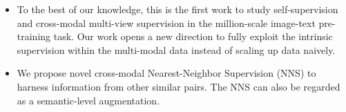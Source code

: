 \begin{itemize}[leftmargin=*]
    \item 
    To the best of our knowledge, this is the first work to study self-supervision and cross-modal multi-view supervision in the million-scale image-text pre-training task. 
    Our work opens a new direction to fully exploit the intrinsic supervision within the multi-modal data instead of scaling up data naively.
    \item We propose novel cross-modal Nearest-Neighbor Supervision (NNS)  to harness information from other similar pairs. The NNS can also be regarded as a semantic-level augmentation.
\end{itemize}
